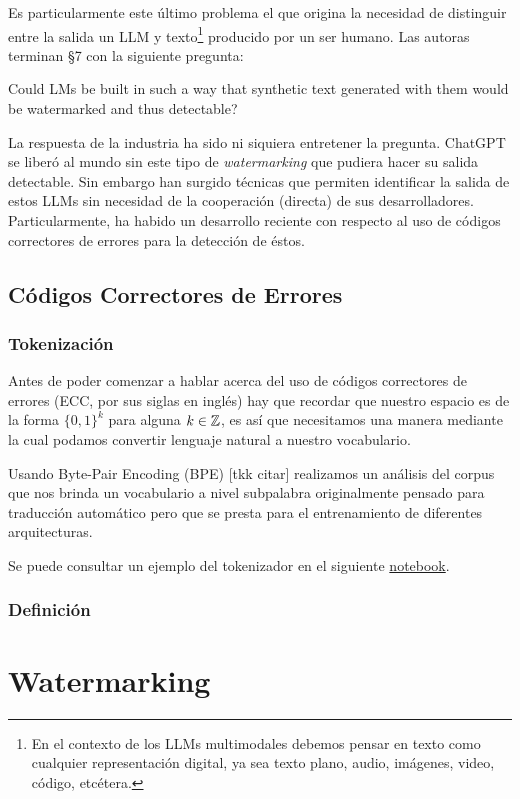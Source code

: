 \documentclass[a4paper,11pt]{article}
\begin{document}
Es particularmente este último problema el que origina la necesidad de distinguir entre la salida un LLM y texto\footnote{En el contexto de los LLMs multimodales debemos pensar en texto como cualquier representación digital, ya sea texto plano, audio, imágenes, video, código, etcétera.} producido por un ser humano. Las autoras terminan \S 7 con la siguiente pregunta:
\begin{displayquote}
    Could LMs be built in such a way that synthetic text generated with them would be watermarked and thus detectable?
\end{displayquote}
\par La respuesta de la industria ha sido ni siquiera entretener la pregunta. ChatGPT se liberó al mundo sin este tipo de \textit{watermarking} que pudiera hacer su salida detectable. Sin embargo han surgido técnicas que permiten identificar la salida de estos LLMs sin necesidad de la cooperación (directa) de sus desarrolladores. Particularmente, ha habido un desarrollo reciente con respecto al uso de códigos correctores de errores para la detección de éstos.
\subsection{Códigos Correctores de Errores}
\subsubsection{Tokenización}
\par Antes de poder comenzar a hablar acerca del uso de códigos correctores de errores (ECC, por sus siglas en inglés) hay que recordar que nuestro espacio es de la forma $\{0,1\}^k$ para alguna $k\in\mathbb{Z}$, es así que necesitamos una manera mediante la cual podamos convertir lenguaje natural a nuestro vocabulario.
\par Usando Byte-Pair Encoding (BPE) [tkk citar] realizamos un análisis del corpus que nos brinda un vocabulario a nivel subpalabra originalmente pensado para traducción automático pero que se presta para el entrenamiento de diferentes arquitecturas.
\par Se puede consultar un ejemplo del tokenizador en el siguiente \href{https://colab.research.google.com/drive/1GlNBf0DbZTonpNINr_cJQ9VolosbFdR4?usp=sharing}{notebook}.
\subsubsection{Definición}
\section{Watermarking}
\end{document}
